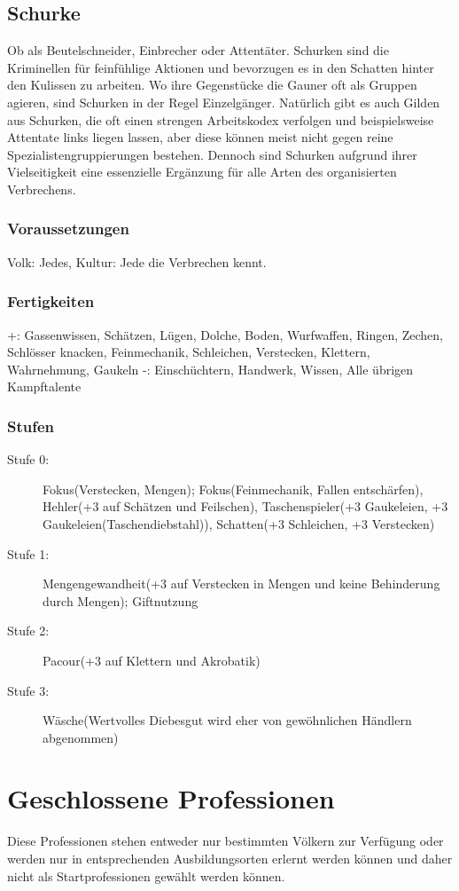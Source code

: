 \documentclass[a4paper,12pt,oneside]{book}
\begin{document}
\section{Schurke}
Ob als Beutelschneider, Einbrecher oder Attentäter. Schurken sind die Kriminellen für feinfühlige Aktionen und bevorzugen es in den Schatten hinter den Kulissen zu arbeiten. Wo ihre Gegenstücke die Gauner oft als Gruppen agieren, sind Schurken in der Regel Einzelgänger. Natürlich gibt es auch Gilden aus Schurken, die oft einen strengen Arbeitskodex verfolgen und beispielsweise Attentate links liegen lassen, aber diese können meist nicht gegen reine Spezialistengruppierungen bestehen. Dennoch sind Schurken aufgrund ihrer Vielseitigkeit eine essenzielle Ergänzung für alle Arten des organisierten Verbrechens.
\subsection{Voraussetzungen}
Volk: Jedes, Kultur: Jede die Verbrechen kennt.
\subsection{Fertigkeiten}
+: Gassenwissen, Schätzen, Lügen, Dolche, Boden, Wurfwaffen, Ringen, Zechen, Schlösser knacken, Feinmechanik, Schleichen, Verstecken, Klettern, Wahrnehmung, Gaukeln
-: Einschüchtern, Handwerk, Wissen, Alle übrigen Kampftalente
\subsection{Stufen}
\begin{description}
\item[Stufe 0:] Fokus(Verstecken, Mengen); Fokus(Feinmechanik, Fallen entschärfen), Hehler(+3 auf Schätzen und Feilschen), Taschenspieler(+3 Gaukeleien, +3 Gaukeleien(Taschendiebstahl)), Schatten(+3 Schleichen, +3 Verstecken)
\item[Stufe 1:] Mengengewandheit(+3 auf Verstecken in Mengen und keine Behinderung durch Mengen); Giftnutzung
\item[Stufe 2:] Pacour(+3 auf Klettern und Akrobatik)
\item[Stufe 3:] Wäsche(Wertvolles Diebesgut wird eher von gewöhnlichen Händlern abgenommen)
\end{description}



\chapter{Geschlossene Professionen}
Diese Professionen stehen entweder nur bestimmten Völkern zur Verfügung oder werden nur in entsprechenden Ausbildungsorten erlernt werden können und daher nicht als Startprofessionen gewählt werden können.
\end{document}
